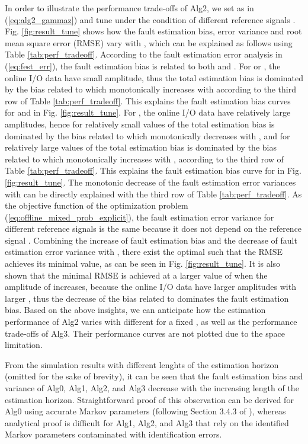 \documentclass[twocolumn]{autart}
\begin{document}
In order to illustrate the performance trade-offs of Alg2, we set  as in (\ref{eq:alg2_gammaz}) and tune  under the condition of different reference signals . Fig. \ref{fig:result_tune} shows how the fault estimation bias, error variance and root mean square error (RMSE) vary with , which can be explained as follows using Table \ref{tab:perf_tradeoff}.
According to the fault estimation error analysis in (\ref{eq:fest_err}), the fault estimation bias is related to both 
and .
For  or , the online I/O data  have small amplitude, thus the total estimation bias is dominated by the bias related to   which monotonically increases with  according to the third row of Table \ref{tab:perf_tradeoff}. This explains the fault estimation bias curves for  and  in Fig. \ref{fig:result_tune}.
For , the online I/O data  have relatively large amplitudes, hence for relatively small values of  the total estimation bias is dominated by the bias related to  which monotonically decreases with , and for relatively large values of  the total estimation bias is dominated by the bias related to  which monotonically increases with , according to the third row of Table \ref{tab:perf_tradeoff}. This explains the fault estimation bias curve for  in Fig. \ref{fig:result_tune}. The monotonic decrease of the fault estimation error variances with  can be directly explained with the third row of Table \ref{tab:perf_tradeoff}.
As the objective function of the optimization problem (\ref{eq:offline_mixed_prob_explicit}), the fault estimation error variance  for different reference signals  is the same because it does not depend on the reference signal . Combining the increase of fault estimation bias and the decrease of fault estimation error variance with , there exist the optimal  such that the RMSE achieves its minimal value, as can be seen in Fig. \ref{fig:result_tune}. It is also shown that the minimal RMSE is achieved at a larger value of  when the amplitude of  increases, because the online I/O data have larger amplitudes with larger , thus the decrease of the bias related to  dominates the fault estimation bias. Based on the above insights, we can anticipate how the estimation performance of Alg2 varies with different  for a fixed , as well as the performance trade-offs of Alg3. Their performance curves are not plotted due to the space limitation.

From the simulation results with different lenghts  of the estimation horizon (omitted for the sake of brevity), it can be seen that the fault estimation bias and variance of Alg0, Alg1, Alg2, and Alg3 decrease with the increasing length  of the estimation horizon. Straightforward proof of this observation can be derived for Alg0 using accurate Markov parameters (following Section 3.4.3 of \cite{Kailath2000}), whereas analytical proof is difficult for Alg1, Alg2, and Alg3 that rely on the identified Markov parameters contaminated with identification errors.
\end{document}
